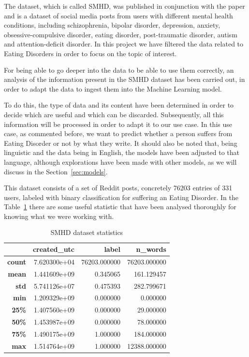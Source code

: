 The dataset, which is called SMHD, was published in conjunction with the paper and is a dataset of social media posts from users with different mental health conditions, including schizophrenia, bipolar disorder, depression, anxiety, obsessive-compulsive disorder, eating disorder, post-traumatic disorder, autism and attention-deficit disorder. In this project we have filtered the data related to Eating Disorders in order to focus on the topic of interest.



For being able to go deeper into the data to be able to use them correctly, an analysis of the information present in the SMHD dataset has been carried out, in order to  adapt the data to ingest them into the Machine Learning model. 

To do this, the type of data and its content have been determined in order to decide which are useful and which can be discarded. Subsequently, all this information will be processed in order to adapt it to our use case. In this use case, as commented before, we want to predict whether a person suffers from Eating Disorder or not by what they write. It should also be noted that, being linguistic and the data being in English, the models have been adjusted to that language, although explorations have been made with other models, as we will discuss in the Section~\ref{sec:models}.

This dataset consists of a set of Reddit posts, concretely 76203 entries of 331 users, labeled with binary classification for suffering an Eating Disorder. In the Table~\ref{tab:SMHDstatistics} there are some useful statistic that have been analysed thoroughly for knowing what we were working with.

\begin{table}[]
\centering
\begin{tabular}{|r|r|r|r|}
\hline
\textbf{}      & \textbf{created\_utc} & \textbf{label} & \textbf{n\_words} \\ \hline
\textbf{count} & 7.620300e+04          & 76203.000000   & 76203.000000      \\ \hline
\textbf{mean}  & 1.441609e+09          & 0.345065       & 161.129457        \\ \hline
\textbf{std}   & 5.741126e+07          & 0.475393       & 282.799671        \\ \hline
\textbf{min}   & 1.209329e+09          & 0.000000       & 0.000000          \\ \hline
\textbf{25\%}  & 1.407560e+09          & 0.000000       & 29.000000         \\ \hline
\textbf{50\%}  & 1.453987e+09          & 0.000000       & 78.000000         \\ \hline
\textbf{75\%}  & 1.490175e+09          & 1.000000       & 184.000000        \\ \hline
\textbf{max}   & 1.514764e+09          & 1.000000       & 12388.000000      \\ \hline
\end{tabular}
\caption{SMHD dataset statistics}
\label{tab:SMHDstatistics}
\end{table}

